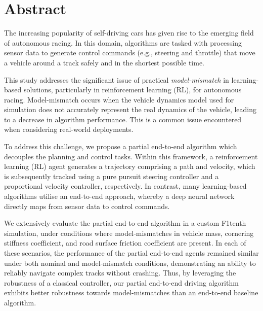 \chapter{Abstract}%


The increasing popularity of self-driving cars has given rise to the emerging field of autonomous racing.
In this domain, algorithms are tasked with processing sensor data to generate control commands (e.g., steering and throttle) that move a vehicle around a track safely and in the shortest possible time.

This study addresses the significant issue of practical \emph{model-mismatch} in learning-based solutions, particularly in reinforcement learning (RL), for autonomous racing. 
Model-mismatch occurs when the vehicle dynamics model used for simulation does not accurately represent the real dynamics of the vehicle, leading to a decrease in algorithm performance.
This is a common issue encountered when considering real-world deployments.

To address this challenge, we propose a partial end-to-end algorithm which decouples the planning and control tasks. 
Within this framework, a reinforcement learning (RL) agent generates a trajectory comprising a path and velocity, which is subsequently tracked using a pure pursuit steering controller and a proportional velocity controller, respectively.
In contrast, many learning-based algorithms utilise an end-to-end approach, whereby a deep neural network directly maps from sensor data to control commands.

We extensively evaluate the partial end-to-end algorithm in a custom F1tenth simulation, under conditions where model-mismatches in vehicle mass, cornering stiffness coefficient, and road surface friction coefficient are present. 
In each of these scenarios, the performance of the partial end-to-end agents remained similar under both nominal and model-mismatch conditions, demonstrating an ability to reliably navigate complex tracks without crashing. 
Thus, by leveraging the robustness of a classical controller, our partial end-to-end driving algorithm exhibits better robustness towards model-mismatches than an end-to-end baseline algorithm.




